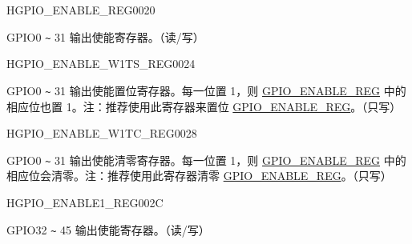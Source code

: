 \begin{register}{H}{GPIO\_ENABLE\_REG}{\hexprefix{}0020}\label{regdesc:GPIOENABLEREG}
%
\regnewline%
\begin{regdesc}\begin{reglist}
\label{fielddesc:GPIOENABLEDATA}\item [GPIO\_ENABLE\_DATA] GPIO0 \verb+~+ 31 输出使能寄存器。（读/写）
\end{reglist}\end{regdesc}
\end{register}


\begin{register}{H}{GPIO\_ENABLE\_W1TS\_REG}{\hexprefix{}0024}\label{regdesc:GPIOENABLEW1TSREG}
%
\regnewline%
\begin{regdesc}\begin{reglist}
\label{fielddesc:GPIOENABLEW1TS}\item [GPIO\_ENABLE\_W1TS] GPIO0 \verb+~+ 31 输出使能置位寄存器。每一位置 1，则 \hyperref[regdesc:GPIOENABLEREG]{GPIO\_ENABLE\_REG} 中的相应位也置 1。注：推荐使用此寄存器来置位 \hyperref[regdesc:GPIOENABLEREG]{GPIO\_ENABLE\_REG}。（只写）
\end{reglist}\end{regdesc}
\end{register}


\begin{register}{H}{GPIO\_ENABLE\_W1TC\_REG}{\hexprefix{}0028}\label{regdesc:GPIOENABLEW1TCREG}
%
\regnewline%
\begin{regdesc}\begin{reglist}
\label{fielddesc:GPIOENABLEW1TC}\item [GPIO\_ENABLE\_W1TC] GPIO0 \verb+~+ 31 输出使能清零寄存器。每一位置 1，则 \hyperref[regdesc:GPIOENABLEREG]{GPIO\_ENABLE\_REG} 中的相应位会清零。注：推荐使用此寄存器清零 \hyperref[regdesc:GPIOENABLEREG]{GPIO\_ENABLE\_REG}。（只写）
\end{reglist}\end{regdesc}
\end{register}


\begin{register}{H}{GPIO\_ENABLE1\_REG}{\hexprefix{}002C}\label{regdesc:GPIOENABLE1REG}
%
%
\regnewline%
\begin{regdesc}\begin{reglist}
\label{fielddesc:GPIOENABLE1DATA}\item [GPIO\_ENABLE1\_DATA] GPIO32 \verb+~+ 45 输出使能寄存器。（读/写）
\end{reglist}\end{regdesc}
\end{register}


